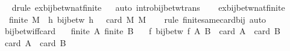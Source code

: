 \begin{isabellebody}
\ \ \isamarkupfalse%
{\isacharparenleft}{\kern0pt}drule\ ex{\isacharunderscore}{\kern0pt}bij{\isacharunderscore}{\kern0pt}betw{\isacharunderscore}{\kern0pt}nat{\isacharunderscore}{\kern0pt}finite{\isacharparenright}{\kern0pt}\isanewline
\ \ \isamarkupfalse%
{\isacharparenleft}{\kern0pt}auto\ intro{\isacharbang}{\kern0pt}{\isacharcolon}{\kern0pt}bij{\isacharunderscore}{\kern0pt}betw{\isacharunderscore}{\kern0pt}trans{\isacharparenright}{\kern0pt}\isanewline
\ \ \isamarkupfalse%
%
\endisatagproof
{\isafoldproof}%
%
\isadelimproof
\isanewline
%
\endisadelimproof
\isanewline
{}\isamarkupfalse%
\ ex{\isacharunderscore}{\kern0pt}bij{\isacharunderscore}{\kern0pt}betw{\isacharunderscore}{\kern0pt}nat{\isacharunderscore}{\kern0pt}finite{\isacharunderscore}{\kern0pt}{}{\isacharcolon}{\kern0pt}\isanewline
\ \ {\isachardoublequoteopen}finite\ M\ {\isasymLongrightarrow}\ {\isasymexists}h{\isachardot}{\kern0pt}\ bij{\isacharunderscore}{\kern0pt}betw\ h\ {\isacharbraceleft}{\kern0pt}{}\ {\isachardot}{\kern0pt}{\isachardot}{\kern0pt}\ card\ M{\isacharbraceright}{\kern0pt}\ M{\isachardoublequoteclose}\isanewline
%
\isadelimproof
\ \ %
\endisadelimproof
%
\isatagproof
{}\isamarkupfalse%
\ {\isacharparenleft}{\kern0pt}rule\ finite{\isacharunderscore}{\kern0pt}same{\isacharunderscore}{\kern0pt}card{\isacharunderscore}{\kern0pt}bij{\isacharparenright}{\kern0pt}\ auto%
\endisatagproof
{\isafoldproof}%
%
\isadelimproof
\isanewline
%
\endisadelimproof
\isanewline
{}\isamarkupfalse%
\ bij{\isacharunderscore}{\kern0pt}betw{\isacharunderscore}{\kern0pt}iff{\isacharunderscore}{\kern0pt}card{\isacharcolon}{\kern0pt}\isanewline
\ \ \ {\isachardoublequoteopen}finite\ A{\isachardoublequoteclose}\ {\isachardoublequoteopen}finite\ B{\isachardoublequoteclose}\isanewline
\ \ \ {\isachardoublequoteopen}{\isacharparenleft}{\kern0pt}{\isasymexists}f{\isachardot}{\kern0pt}\ bij{\isacharunderscore}{\kern0pt}betw\ f\ A\ B{\isacharparenright}{\kern0pt}\ {\isasymlongleftrightarrow}\ {\isacharparenleft}{\kern0pt}card\ A\ {\isacharequal}{\kern0pt}\ card\ B{\isacharparenright}{\kern0pt}{\isachardoublequoteclose}\isanewline
%
\isadelimproof
%
\endisadelimproof
%
\isatagproof
{}\isamarkupfalse%
\isanewline
\ \ \isamarkupfalse%
\ {\isachardoublequoteopen}card\ A\ {\isacharequal}{\kern0pt}\ card\ B{\isachardoublequoteclose}\isanewline
\ \ \isamarkupfalse%
\ \isamarkupfalse%

\end{isabellebody}
